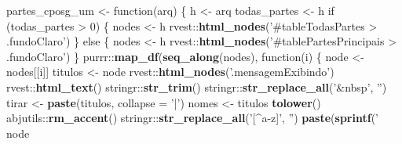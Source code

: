 \documentclass[]{book}
\newenvironment{Shaded}{\begin{snugshade}}{\end{snugshade}}
\newcommand{\KeywordTok}[1]{\textcolor[rgb]{0.13,0.29,0.53}{\textbf{{#1}}}}
\newcommand{\DataTypeTok}[1]{\textcolor[rgb]{0.13,0.29,0.53}{{#1}}}
\newcommand{\DecValTok}[1]{\textcolor[rgb]{0.00,0.00,0.81}{{#1}}}
\newcommand{\StringTok}[1]{\textcolor[rgb]{0.31,0.60,0.02}{{#1}}}
\newcommand{\NormalTok}[1]{{#1}}
\begin{document}
\begin{Shaded}
\begin{Highlighting}[]
\NormalTok{partes_cposg_um <-}\StringTok{ }\NormalTok{function(arq) \{}
  \NormalTok{h <-}\StringTok{ }\NormalTok{arq %>%}\StringTok{ }\NormalTok{xml2::}\KeywordTok{read_html}\NormalTok{(}\DataTypeTok{encoding =} \StringTok{'UTF-8'}\NormalTok{)}
  \NormalTok{todas_partes <-}\StringTok{ }\NormalTok{h %>%}\StringTok{ }\NormalTok{rvest::}\KeywordTok{html_nodes}\NormalTok{(}\StringTok{'#tableTodasPartes'}\NormalTok{) %>%}\StringTok{ }\KeywordTok{length}\NormalTok{()}
  \NormalTok{if (todas_partes >}\StringTok{ }\DecValTok{0}\NormalTok{) \{}
    \NormalTok{nodes <-}\StringTok{ }\NormalTok{h %>%}\StringTok{ }
\StringTok{      }\NormalTok{rvest::}\KeywordTok{html_nodes}\NormalTok{(}\StringTok{'#tableTodasPartes > .fundoClaro'}\NormalTok{)}
  \NormalTok{\} else \{}
    \NormalTok{nodes <-}\StringTok{ }\NormalTok{h %>%}\StringTok{ }
\StringTok{      }\NormalTok{rvest::}\KeywordTok{html_nodes}\NormalTok{(}\StringTok{'#tablePartesPrincipais > .fundoClaro'}\NormalTok{)}
  \NormalTok{\}}
  \NormalTok{purrr::}\KeywordTok{map_df}\NormalTok{(}\KeywordTok{seq_along}\NormalTok{(nodes), function(i) \{}
    \NormalTok{node <-}\StringTok{ }\NormalTok{nodes[[i]]}
    \NormalTok{titulos <-}\StringTok{ }\NormalTok{node %>%}\StringTok{ }
\StringTok{      }\NormalTok{rvest::}\KeywordTok{html_nodes}\NormalTok{(}\StringTok{'.mensagemExibindo'}\NormalTok{) %>%}\StringTok{ }
\StringTok{      }\NormalTok{rvest::}\KeywordTok{html_text}\NormalTok{() %>%}\StringTok{ }
\StringTok{      }\NormalTok{stringr::}\KeywordTok{str_trim}\NormalTok{() %>%}\StringTok{ }
\StringTok{      }\NormalTok{stringr::}\KeywordTok{str_replace_all}\NormalTok{(}\StringTok{'&nbsp'}\NormalTok{, }\StringTok{''}\NormalTok{)}
    \NormalTok{tirar <-}\StringTok{ }\KeywordTok{paste}\NormalTok{(titulos, }\DataTypeTok{collapse =} \StringTok{'|'}\NormalTok{)}
    \NormalTok{nomes <-}\StringTok{ }\NormalTok{titulos %>%}\StringTok{ }
\StringTok{      }\KeywordTok{tolower}\NormalTok{() %>%}\StringTok{ }
\StringTok{      }\NormalTok{abjutils::}\KeywordTok{rm_accent}\NormalTok{() %>%}\StringTok{ }
\StringTok{      }\NormalTok{stringr::}\KeywordTok{str_replace_all}\NormalTok{(}\StringTok{'[^a-z]'}\NormalTok{, }\StringTok{''}\NormalTok{) %>%}\StringTok{ }
\StringTok{      }\KeywordTok{paste}\NormalTok{(}\KeywordTok{sprintf}\NormalTok{(}\StringTok{'%02d'}\NormalTok{, }\DecValTok{1}\NormalTok{:}\KeywordTok{length}\NormalTok{(.)), }\DataTypeTok{sep =} \StringTok{'_'}\NormalTok{)}
    \NormalTok{node %>%}\StringTok{ }
}}}}}}}}}}}}}}
\end{Highlighting}
\end{Shaded}
\end{document}
